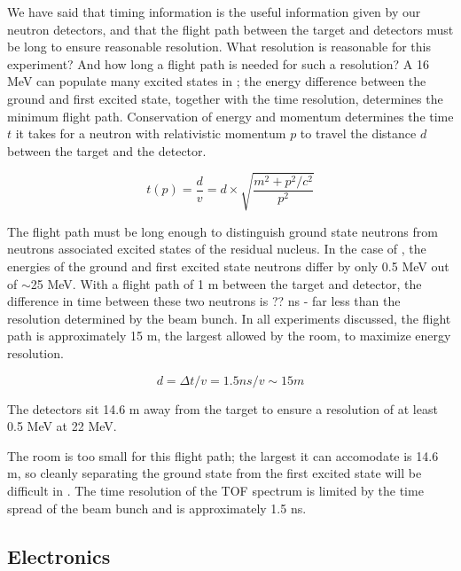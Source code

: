 We have said that timing information is the useful information given by our neutron detectors, and that the flight path between the target and detectors must be long to ensure reasonable resolution.  What resolution is reasonable for this experiment?  And how long a flight path is needed for such a resolution?  A 16 MeV  can populate many excited states in \GeTargets; the energy difference between the ground and first excited state, together with the time resolution, determines the minimum flight path.  Conservation of energy and momentum determines the time $t$ it takes for a neutron with relativistic momentum $p$ to travel the distance $d$ between the target and the detector.

\begin{equation}
t(p) = \frac{d}{v} = d\times\sqrt{\frac{m^2+p^2/c^2}{p^2}}
\label{eq:TOF}
\end{equation}

The flight path must be long enough to distinguish ground state neutrons from neutrons associated excited states of the residual nucleus.  In the case of ,  the energies of the ground and first excited state neutrons differ by only 0.5 MeV out of $\sim$25 MeV.  With a flight path of 1 m between the target and detector, the difference in time between these two neutrons is ?? ns - far less than the resolution determined by the beam bunch.  In all experiments discussed, the flight path is approximately 15 m, the largest allowed by the room, to maximize energy resolution.  

\begin{equation}
d = \Delta t/v = 1.5 ns / v \sim 15 m
\label{eq:requiredDist}
\end{equation}

The detectors sit 14.6 m away from the target to ensure a resolution of at least 0.5 MeV at 22 MeV.

The room is too small for this flight path; the largest it can accomodate is 14.6 m, so cleanly separating the ground state from the first excited state will be difficult in \GeTargets.  The time resolution of the TOF spectrum is limited by the time spread of the beam bunch and is approximately 1.5 ns.  




\subsection{Electronics}

